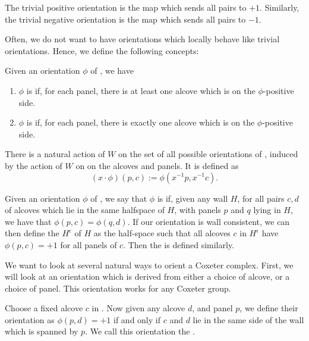 \documentclass[11pt]{article}
\begin{document}
\begin{example}
    The trivial positive orientation is the map which sends all pairs to $+1$. Similarly, the trivial negative orientation is the map which sends all pairs to $-1$. 
\end{example}

Often, we do not want to have orientations which locally behave like trivial orientations. Hence, we define the following concepts:

\begin{definition}
    Given an orientation $\phi$ of \sg, we have
    \begin{enumerate}
        \item $\phi$ is  if, for each panel, there is at least one alcove which is on the $\phi$-positive side.
        \item $\phi$ is  if, for each panel, there is exactly one alcove which is on the $\phi$-positive side.
    \end{enumerate}
\end{definition}


There is a natural action of $W$ on the set of all possible orientations of \sg, induced by the action of $W$ on on the alcoves and panels. It is defined as 
\[(x\cdot\phi)(p,c):=\phi(x^{-1}p,x^{-1}c).\]

\begin{definition}
    Given an orientation $\phi$ of \sg, we say that $\phi$ is  if, given any wall $H$, for all pairs $c,d$ of alcoves which lie in the same halfspace of $H$, with panels $p$ and $q$ lying in $H$, we have that $\phi(p,c)=\phi(q,d)$. If our orientation is wall consistent, we can then define the  $H^{\epsilon}$ of $H$ as the half-space such that all alcoves $c$ in $H^{\epsilon}$ have $\phi(p,c)=+1$ for all panels of $c$. Then the  is defined similarly.
\end{definition}

We want to look at several natural ways to orient a Coxeter complex. First, we will look at an orientation which is derived from either a choice of alcove, or a choice of panel. This orientation works for any Coxeter group.

\begin{definition}
    Choose a fixed alcove $c$ in \sg. Now given any alcove $d$, and panel $p$, we define their orientation as $\phi(p,d)=+1$ if and only if $c$ and $d$ lie in the same side of the wall which is spanned by $p$. We call this orientation the .
\end{definition}
\end{document}
